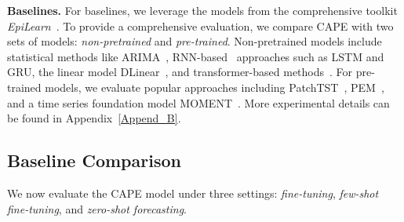 \noindent\textbf{Baselines.} For baselines, we leverage the models from the comprehensive toolkit \textit{EpiLearn}~\cite{liu2024epilearn}. To provide a comprehensive evaluation, we compare CAPE with two sets of models: \textit{non-pretrained} and \textit{pre-trained}. Non-pretrained models include statistical methods like ARIMA~\cite{panagopoulos2021transfer}, RNN-based~\cite{wang2020time, natarajan2023outbreak} approaches such as LSTM and GRU, the linear model DLinear~\cite{zeng2023transformers}, and transformer-based methods~\cite{wu2021autoformer, zhou2021informer, zhou2022fedformer}. For pre-trained models, we evaluate popular approaches including PatchTST~\cite{nie2022time}, PEM~\cite{kamarthi2023pems}, and a time series foundation model MOMENT~\cite{goswami2024moment}. {More experimental details can be found in Appendix~\ref{Append_B}.}


\iffalse
\textbf{Settings.}  
We adopt an input length of 36~\cite{wu2023timesnet, wang2024tssurvey} and a patch size of 4 for applicable models. For the environment estimator defined in Eq.~\eqref{eq: env_estimator}, a shared weight \( w_k \) is used for all environment representations. All results are evaluated using Mean Squared Error (MSE). 
More details are provided in Appendix~\ref{Append_B}.
\fi



\subsection{Baseline Comparison}
We now evaluate the CAPE model under three settings: \textit{fine-tuning}, \textit{few-shot fine-tuning}, and \textit{zero-shot forecasting}.



